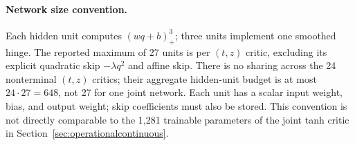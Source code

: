\paragraph{Network size convention.}
Each hidden unit computes $(wq+b)_+^3$; three units implement one smoothed hinge. The reported maximum of 27 units is per $(t,z)$ critic, excluding its explicit quadratic skip $-\lambda q^2$ and affine skip. There is no sharing across the 24 nonterminal $(t,z)$ critics; their aggregate hidden-unit budget is at most $24\cdot27=648$, not 27 for one joint network. Each unit has a scalar input weight, bias, and output weight; skip coefficients must also be stored. This convention is not directly comparable to the 1,281 trainable parameters of the joint tanh critic in Section~\ref{sec:operationalcontinuous}.
